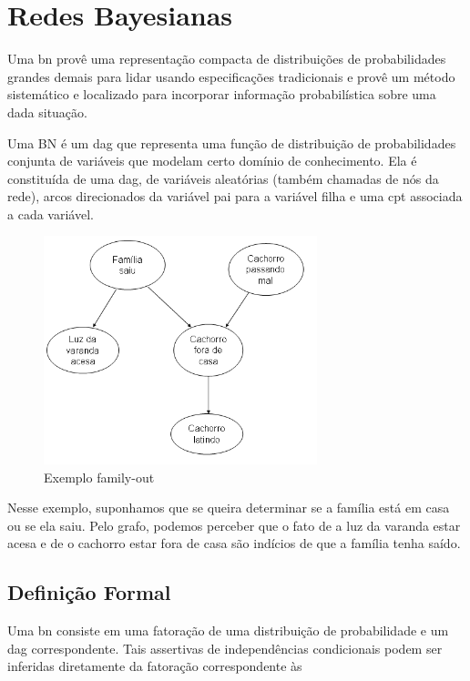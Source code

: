 \chapter{Redes Bayesianas}%
Uma \gls{bn} provê uma representação compacta de distribuições de probabilidades grandes demais para lidar usando especificações tradicionais e provê um método sistemático e localizado para incorporar informação probabilística sobre uma dada situação.

Uma BN é um \gls{dag} que representa uma função de distribuição de probabilidades conjunta de variáveis que modelam certo domínio de conhecimento. Ela é constituída de uma \gls{dag}, de variáveis aleatórias (também chamadas de nós da rede), arcos direcionados da variável pai para a variável filha e uma \gls{cpt} associada a cada variável.
\begin{figure}[H]
	\centering
	\includegraphics[width = 300px]{figuras/BN1}
	\caption[extraída do artigo do Laecio]{Exemplo family-out}
	\label{fig:familyBN}
\end{figure}

Nesse exemplo, suponhamos que se queira determinar se a família está em casa ou se ela saiu. Pelo grafo, podemos perceber que o fato de a luz da varanda estar acesa e de o cachorro estar fora de casa são indícios de que a família tenha saído. 

\section{Definição Formal}
Uma \gls{bn} consiste em uma fatoração de uma distribuição de probabilidade e um \gls{dag} correspondente. Tais assertivas de independências condicionais podem ser inferidas diretamente da fatoração correspondente às 